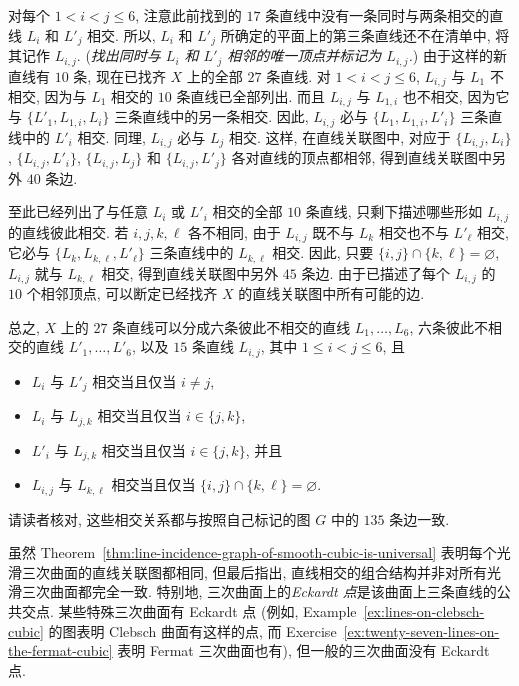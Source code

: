 \begin{Proof}
对每个 $1<i<j\le6$, 注意此前找到的 $17$ 条直线中没有一条同时与两条相交的直线 $L_{i}$ 和 $L'_{j}$ 相交. 所以, $L_{i}$ 和 $L'_{j}$ 所确定的平面上的第三条直线还不在清单中, 将其记作 $L_{i,j}$. (\emph{找出同时与 $L_{i}$ 和 $L'_{j}$ 相邻的唯一顶点并标记为 $L_{i,j}$.}) 由于这样的新直线有 $10$ 条, 现在已找齐 $X$ 上的全部 $27$ 条直线. 对 $1<i<j\le6$, $L_{i,j}$ 与 $L_{1}$ 不相交, 因为与 $L_{1}$ 相交的 $10$ 条直线已全部列出. 而且 $L_{i,j}$ 与 $L_{1,i}$ 也不相交, 因为它与 $\{L'_{1},L_{1,i},L_{i}\}$ 三条直线中的另一条相交. 因此, $L_{i,j}$ 必与 $\{L_{1},L_{1,i},L'_{i}\}$ 三条直线中的 $L'_{i}$ 相交. 同理, $L_{i,j}$ 必与 $L_{j}$ 相交. 这样, 在直线关联图中, 对应于 $\{L_{i,j},L_{i}\}$, $\{L_{i,j},L'_{i}\}$, $\{L_{i,j},L_{j}\}$ 和 $\{L_{i,j},L'_{j}\}$ 各对直线的顶点都相邻, 得到直线关联图中另外 $40$ 条边.

至此已经列出了与任意 $L_{i}$ 或 $L'_{i}$ 相交的全部 $10$ 条直线, 只剩下描述哪些形如 $L_{i,j}$ 的直线彼此相交. 若 $i,j,k,\ell$ 各不相同, 由于 $L_{i,j}$ 既不与 $L_{k}$ 相交也不与 $L'_{\ell}$ 相交, 它必与 $\{L_{k},L_{k,\ell},L'_{\ell}\}$ 三条直线中的 $L_{k,\ell}$ 相交. 因此, 只要 $\{i,j\}\cap\{k,\ell\}=\varnothing$, $L_{i,j}$ 就与 $L_{k,\ell}$ 相交, 得到直线关联图中另外 $45$ 条边. 由于已描述了每个 $L_{i,j}$ 的 $10$ 个相邻顶点, 可以断定已经找齐 $X$ 的直线关联图中所有可能的边.

总之, $X$ 上的 $27$ 条直线可以分成六条彼此不相交的直线 $L_{1},\ldots,L_{6}$, 六条彼此不相交的直线 $L'_{1},\ldots,L'_{6}$, 以及 $15$ 条直线 $L_{i,j}$, 其中 $1\le i<j\le6$, 且
\begin{itemize}
  \item $L_{i}$ 与 $L'_{j}$ 相交当且仅当 $i\ne j$,
  \item $L_{i}$ 与 $L_{j,k}$ 相交当且仅当 $i\in\{j,k\}$,
  \item $L'_{i}$ 与 $L_{j,k}$ 相交当且仅当 $i\in\{j,k\}$, 并且
  \item $L_{i,j}$ 与 $L_{k,\ell}$ 相交当且仅当 $\{i,j\}\cap\{k,\ell\}=\varnothing$.
\end{itemize}
请读者核对, 这些相交关系都与按照自己标记的图 $G$ 中的 $135$ 条边一致.
\end{Proof}

\leavevmode{}\label{idx:eckardt-point}虽然 Theorem~\ref{thm:line-incidence-graph-of-smooth-cubic-is-universal} 表明每个光滑三次曲面的直线关联图都相同, 但最后指出, 直线相交的组合结构并非对所有光滑三次曲面都完全一致. 特别地, 三次曲面上的\emph{Eckardt 点}是该曲面上三条直线的公共交点. 某些特殊三次曲面有 Eckardt 点 (例如, Example~\ref{ex:lines-on-clebsch-cubic} 的图表明 Clebsch 曲面有这样的点, 而 Exercise~\ref{ex:twenty-seven-lines-on-the-fermat-cubic} 表明 Fermat 三次曲面也有), 但一般的三次曲面没有 Eckardt 点.


